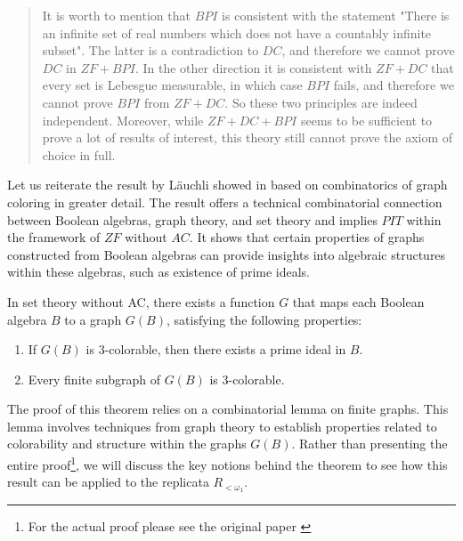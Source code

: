 \begin{quote}
  It is worth to mention that $BPI$ is consistent with the statement "There is an infinite set of real
  numbers which does not have a countably infinite subset". The latter is a contradiction to $DC$, and
  therefore we cannot prove $DC$ in $ZF + BPI$. In the other direction it is consistent with $ZF + DC$ that
  every set is Lebesgue measurable, in which case $BPI$ fails, and therefore we cannot prove $BPI$ from
  $ZF + DC$. So these two principles are indeed independent. Moreover, while $ZF + DC + BPI$ seems
  to be sufficient to prove a lot of results of interest, this theory still cannot prove the axiom of choice
  in full.
\end{quote}


Let us reiterate the result by L{\"a}uchli showed in \cite{Luchli1971ColoringIG} based on combinatorics of graph coloring in greater detail. The result offers a technical combinatorial connection between Boolean algebras, graph theory, and set theory and implies $PIT$ within the framework of $ZF$ without $AC$. It shows that certain properties of graphs constructed from Boolean algebras can provide insights into algebraic structures within these algebras, such as existence of prime ideals.

\begin{theorem}\label{theorem_laeuchli}
  In set theory without AC, there exists a function $G$ that maps each Boolean algebra $B$ to a graph $G(B)$, satisfying the following properties:
  \begin{enumerate}
      \item If $G(B)$ is 3-colorable, then there exists a prime ideal in $B$.
      \item Every finite subgraph of $G(B)$ is 3-colorable.
  \end{enumerate}  
\end{theorem}

The proof of this theorem relies on a combinatorial lemma on finite graphs. This lemma involves techniques from graph theory to establish properties related to colorability and structure within the graphs $G(B)$. Rather than presenting the entire proof\footnote{For the actual proof please see the original paper \cite{Luchli1971ColoringIG}}, we will discuss the key notions behind the theorem to see how this result can be applied to the replicata $R_{<\omega_1}$.

